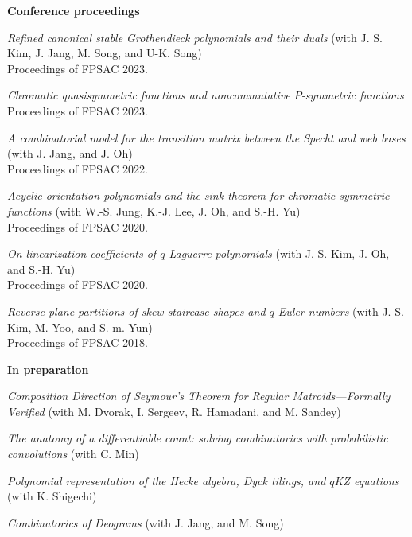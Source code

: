 \documentclass[letterpaper,11pt]{article}
\begin{document}
{\bf Conference proceedings}
\begin{etaremune}
    \item \emph{Refined canonical stable Grothendieck polynomials and their duals} (with J. S. Kim, J. Jang, M. Song, and U-K. Song) \\
    Proceedings of FPSAC 2023.

    \item \emph{Chromatic quasisymmetric functions and noncommutative $P$-symmetric functions} \\ Proceedings of FPSAC 2023.

    \item \emph{A combinatorial model for the transition matrix between the Specht and web bases} (with J. Jang, and J. Oh) \\
    Proceedings of FPSAC 2022.
    
    \item \emph{Acyclic orientation polynomials and the sink theorem for chromatic symmetric functions} (with W.-S. Jung, K.-J. Lee, J. Oh, and S.-H. Yu) \\
    Proceedings of FPSAC 2020.
	
    \item  \emph{On linearization coefficients of $q$-Laguerre polynomials} (with J. S. Kim, J. Oh, and  S.-H. Yu) \\
    Proceedings of FPSAC 2020.
	
    \item \emph{Reverse plane partitions of skew staircase shapes and $q$-Euler numbers} (with J. S. Kim, M. Yoo, and S.-m. Yun) \\
    Proceedings of FPSAC 2018.
\end{etaremune}

{\bf In preparation}
\begin{etaremune}
    \item \emph{Composition Direction of Seymour’s Theorem for
Regular Matroids—Formally Verified} (with M. Dvorak, I. Sergeev, R. Hamadani, and M. Sandey)

    \item \emph{The anatomy of a differentiable count: solving combinatorics with probabilistic convolutions} (with C. Min)

    \item \emph{Polynomial representation of the Hecke algebra, Dyck tilings, and \( q \)KZ equations} (with K. Shigechi)

    \item \emph{Combinatorics of Deograms} (with J. Jang, and M. Song)
\end{etaremune}
\end{document}

